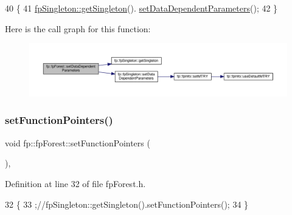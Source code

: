 \begin{DoxyCode}
40                                                     \{
41                 \hyperlink{classfp_1_1fpSingleton_a8bdae77b68521003e3fc630edec2e240}{fpSingleton::getSingleton}().
      \hyperlink{classfp_1_1fpSingleton_a3edf17209500e72c76ef816e32666eb2}{setDataDependentParameters}();
42             \}
\end{DoxyCode}
Here is the call graph for this function\+:\nopagebreak
\begin{figure}[H]
\begin{center}
\leavevmode
\includegraphics[width=350pt]{classfp_1_1fpForest_a846818c46a4423f668f19d3493864192_cgraph}
\end{center}
\end{figure}
\mbox{\label{classfp_1_1fpForest_ab25fdbad494f8bd358ccb3a1fdbcb51d}} 
\subsubsection{\texorpdfstring{set\+Function\+Pointers()}{setFunctionPointers()}}
{\footnotesize\ttfamily void fp\+::fp\+Forest\+::set\+Function\+Pointers (\begin{DoxyParamCaption}{ }\end{DoxyParamCaption})\hspace{0.3cm}{\ttfamily [inline]}, {\ttfamily [protected]}}



Definition at line 32 of file fp\+Forest.\+h.


\begin{DoxyCode}
32                                              \{
33                 ;\textcolor{comment}{//fpSingleton::getSingleton().setFunctionPointers();}
34             \}
\end{DoxyCode}
\mbox{\label{classfp_1_1fpForest_ad13bbbd33291ef5f523691eccc23aece}} 
